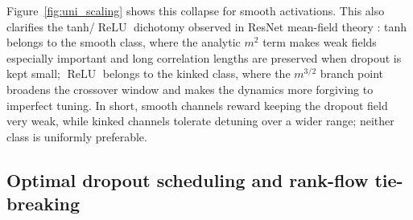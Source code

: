 \documentclass{article}
\DeclareMathOperator{\ReLU}{ReLU}
\newcommand{\relu}{\ensuremath{\ReLU}}
\theoremstyle{plain}
\theoremstyle{definition}
\theoremstyle{remark}
\begin{document}
Figure~\ref{fig:uni_scaling} shows this collapse for smooth activations. This also clarifies the tanh/\relu{} dichotomy observed in ResNet mean-field theory \cite{yang2017meanfieldresnets}: tanh belongs to the smooth class, where the analytic \(m^2\) term makes weak fields especially important and long correlation lengths are preserved when dropout is kept small; \relu{} belongs to the kinked class, where the \(m^{3/2}\) branch point broadens the crossover window and makes the dynamics more forgiving to imperfect tuning. In short, smooth channels reward keeping the dropout field very weak, while kinked channels tolerate detuning over a wider range; neither class is uniformly preferable.










\subsection{Optimal dropout scheduling and rank-flow tie-breaking}
\label{subsec:optimal_dropout}
\end{document}
